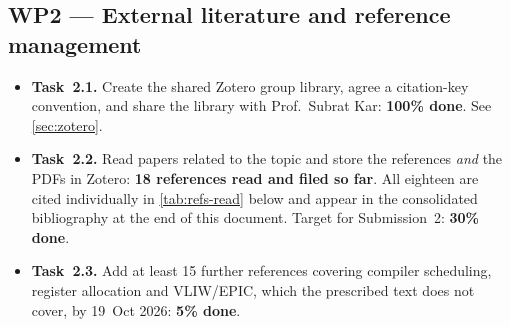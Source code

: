 \documentclass[11pt,a4paper]{report}
\begin{document}
\subsection*{WP2 --- External literature and reference management}
\begin{itemize}[leftmargin=*]
  \item \textbf{Task~2.1.} Create the shared Zotero group library, agree
    a citation-key convention, and share the library with
    Prof.\ Subrat Kar: \textbf{100\% done}. See \cref{sec:zotero}.
  \item \textbf{Task~2.2.} Read papers related to the topic and store
    the references \emph{and} the PDFs in Zotero:
    \textbf{18 references read and filed so far}. All eighteen are cited
    individually in \cref{tab:refs-read} below and appear in the
    consolidated bibliography at the end of this document. Target for
    Submission~2: \textbf{30\% done}.
  \item \textbf{Task~2.3.} Add at least 15 further references covering
    compiler scheduling, register allocation and VLIW/EPIC, which the
    prescribed text does not cover, by 19~Oct 2026:
    \textbf{5\% done}.
\end{itemize}
\end{document}
